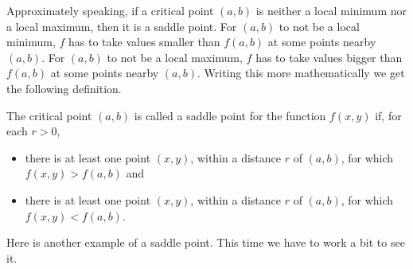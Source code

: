 Approximately speaking, if a critical point $(a,b)$ is neither a local 
minimum nor a local maximum, then it is a saddle point. For $(a,b)$ to not
be a local minimum, $f$ has to take values smaller than $f(a,b)$ at some
points nearby $(a,b)$. For $(a,b)$ to not be a local maximum, $f$ has to take values bigger than $f(a,b)$ at some points nearby $(a,b)$.  Writing this
more mathematically we get the following definition.


\begin{defn}\label{def saddle point}
The critical point $(a,b)$ is called a saddle point for the function 
$f(x,y)$ if, for each $r>0$, 
\begin{itemize}
\item 
there is at least one point $(x,y)$, within a distance $r$ of $(a,b)$,
for which $f(x,y)>f(a,b)$ and
\item
there is at least one point $(x,y)$, within a distance $r$ of $(a,b)$,
for which $f(x,y)<f(a,b)$.
\end{itemize}
\end{defn}

Here is another example of a saddle point. This time we have to work
a bit to see it.

